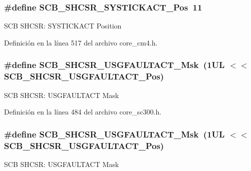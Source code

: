 \subsubsection[{\texorpdfstring{S\+C\+B\+\_\+\+S\+H\+C\+S\+R\+\_\+\+S\+Y\+S\+T\+I\+C\+K\+A\+C\+T\+\_\+\+Pos}{SCB_SHCSR_SYSTICKACT_Pos}}]{\setlength{\rightskip}{0pt plus 5cm}\#define S\+C\+B\+\_\+\+S\+H\+C\+S\+R\+\_\+\+S\+Y\+S\+T\+I\+C\+K\+A\+C\+T\+\_\+\+Pos~11}\hypertarget{group___c_m_s_i_s___s_c_b_gaec9ca3b1213c49e2442373445e1697de}{}\label{group___c_m_s_i_s___s_c_b_gaec9ca3b1213c49e2442373445e1697de}
S\+CB S\+H\+C\+SR\+: S\+Y\+S\+T\+I\+C\+K\+A\+CT Position 

Definición en la línea 517 del archivo core\+\_\+cm4.\+h.

\subsubsection[{\texorpdfstring{S\+C\+B\+\_\+\+S\+H\+C\+S\+R\+\_\+\+U\+S\+G\+F\+A\+U\+L\+T\+A\+C\+T\+\_\+\+Msk}{SCB_SHCSR_USGFAULTACT_Msk}}]{\setlength{\rightskip}{0pt plus 5cm}\#define S\+C\+B\+\_\+\+S\+H\+C\+S\+R\+\_\+\+U\+S\+G\+F\+A\+U\+L\+T\+A\+C\+T\+\_\+\+Msk~(1\+U\+L $<$$<$ S\+C\+B\+\_\+\+S\+H\+C\+S\+R\+\_\+\+U\+S\+G\+F\+A\+U\+L\+T\+A\+C\+T\+\_\+\+Pos)}\hypertarget{group___c_m_s_i_s___s_c_b_gab3166103b5a5f7931d0df90949c47dfe}{}\label{group___c_m_s_i_s___s_c_b_gab3166103b5a5f7931d0df90949c47dfe}
S\+CB S\+H\+C\+SR\+: U\+S\+G\+F\+A\+U\+L\+T\+A\+CT Mask 

Definición en la línea 484 del archivo core\+\_\+sc300.\+h.

\subsubsection[{\texorpdfstring{S\+C\+B\+\_\+\+S\+H\+C\+S\+R\+\_\+\+U\+S\+G\+F\+A\+U\+L\+T\+A\+C\+T\+\_\+\+Msk}{SCB_SHCSR_USGFAULTACT_Msk}}]{\setlength{\rightskip}{0pt plus 5cm}\#define S\+C\+B\+\_\+\+S\+H\+C\+S\+R\+\_\+\+U\+S\+G\+F\+A\+U\+L\+T\+A\+C\+T\+\_\+\+Msk~(1\+U\+L $<$$<$ S\+C\+B\+\_\+\+S\+H\+C\+S\+R\+\_\+\+U\+S\+G\+F\+A\+U\+L\+T\+A\+C\+T\+\_\+\+Pos)}\hypertarget{group___c_m_s_i_s___s_c_b_gab3166103b5a5f7931d0df90949c47dfe}{}\label{group___c_m_s_i_s___s_c_b_gab3166103b5a5f7931d0df90949c47dfe}
S\+CB S\+H\+C\+SR\+: U\+S\+G\+F\+A\+U\+L\+T\+A\+CT Mask 

